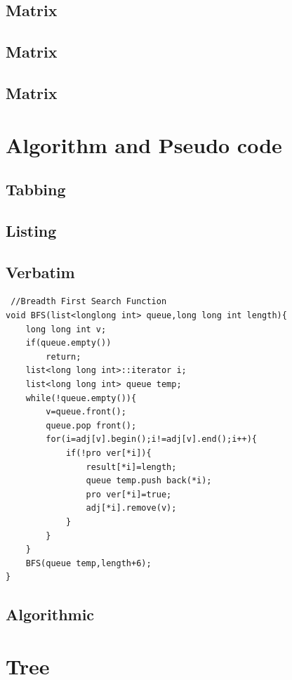 \documentclass{article}
\begin{document}
\subsection{Matrix}
\subsection{Matrix}
\subsection{Matrix}

\section{Algorithm and Pseudo code} %
\subsection{Tabbing}
 

\subsection{Listing}

 
\subsection{Verbatim}
\begin{verbatim}
 //Breadth First Search Function
void BFS(list<longlong int> queue,long long int length){
	long long int v;
	if(queue.empty())
		return;
	list<long long int>::iterator i;
	list<long long int> queue temp;
	while(!queue.empty()){
		v=queue.front();
		queue.pop front();
		for(i=adj[v].begin();i!=adj[v].end();i++){
			if(!pro ver[*i]){
				result[*i]=length;
				queue temp.push back(*i);
				pro ver[*i]=true;
				adj[*i].remove(v);
			}
		}
	}
	BFS(queue temp,length+6);
}
\end{verbatim}

\subsection{Algorithmic}



\section{Tree} %
\end{document}
